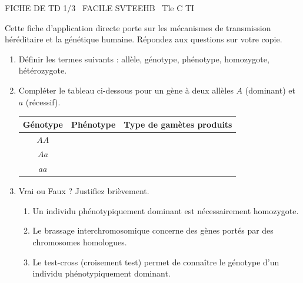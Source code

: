 \documentclass[11pt]{article}
\begin{document}
\begin{tcolorbox}[enhanced,colback=popink,colframe=popink,arc=10pt,boxrule=0pt,left=12pt,right=12pt,top=9pt,bottom=9pt]
{\color{white}\popxbold\small FICHE DE TD 1/3 \textbullet\ FACILE \hfill SVTEEHB \textbullet\ Tle C TI\par}
\end{tcolorbox}
\vspace{4pt}
Cette fiche d'application directe porte sur les mécanismes de transmission héréditaire et la génétique humaine. Répondez aux questions sur votre copie.

\begin{exercice}
\begin{enumerate}
    \item Définir les termes suivants : allèle, génotype, phénotype, homozygote, hétérozygote.
    \item Compléter le tableau ci-dessous pour un gène à deux allèles $A$ (dominant) et $a$ (récessif).
    \begin{center}
    \begin{tabular}{|c|c|c|}
    \hline
    \textbf{Génotype} & \textbf{Phénotype} & \textbf{Type de gamètes produits} \\
    \hline
    $AA$ & & \\
    \hline
    $Aa$ & & \\
    \hline
    $aa$ & & \\
    \hline
    \end{tabular}
    \end{center}
    \item Vrai ou Faux ? Justifiez brièvement.
    \begin{enumerate}
        \item Un individu phénotypiquement dominant est nécessairement homozygote.
        \item Le brassage interchromosomique concerne des gènes portés par des chromosomes homologues.
        \item Le test-cross (croisement test) permet de connaître le génotype d'un individu phénotypiquement dominant.
    \end{enumerate}
\end{enumerate}
\end{exercice}
\end{document}
